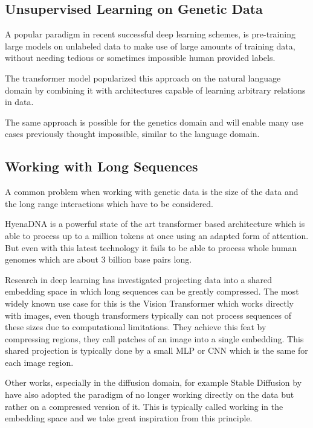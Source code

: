 

\subsection{Unsupervised Learning on Genetic Data}

A popular paradigm in recent successful deep learning schemes, is pre-training large models on unlabeled data to make use of large amounts of training data, without needing tedious or sometimes impossible human provided labels.

The transformer model \citep{vaswani2017attention} popularized this approach on the natural language domain by combining it with architectures capable of learning arbitrary relations in data. 

The same approach is possible for the genetics domain and will enable many use cases previously thought impossible, similar to the language domain.

\subsection{Working with Long Sequences}

A common problem when working with genetic data is the size of the data and the long range interactions which have to be considered.

HyenaDNA \citep{nguyen2023hyenadna} is a powerful state of the art transformer based architecture which is able to process up to a million tokens at once using an adapted form of attention. But even with this latest technology it fails to be able to process whole human genomes which are about 3 billion base pairs long.

Research in deep learning has investigated projecting data into a shared embedding space in which long sequences can be greatly compressed. The most widely known use case for this is the Vision Transformer \citep{dosovitskiy2021an} which works directly with images, even though transformers typically can not process sequences of these sizes due to computational limitations. They achieve this feat by compressing regions, they call patches of an image into a single embedding. This shared projection is typically done by a small MLP or CNN which is the same for each image region. 

Other works, especially in the diffusion domain, for example Stable Diffusion by \cite{rombach2021highresolution} have also adopted the paradigm of no longer working directly on the data but rather on a compressed version of it. This is typically called working in the embedding space and we take great inspiration from this principle.

